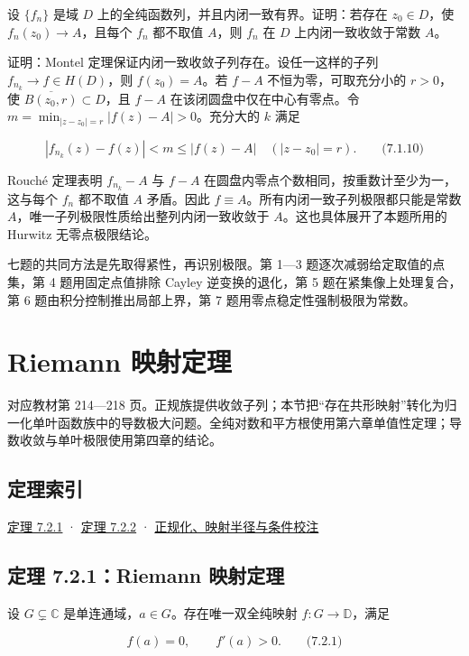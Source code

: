 \documentclass[11pt,a4paper]{article}
\begin{document}
设 \(\{f_n\}\) 是域 \(D\) 上的全纯函数列，并且内闭一致有界。证明：若存在
\(z_0\in D\)，使 \(f_n(z_0)\to A\)，且每个 \(f_n\) 都不取值 \(A\)，则
\(f_n\) 在 \(D\) 上内闭一致收敛于常数 \(A\)。

证明：Montel 定理保证内闭一致收敛子列存在。设任一这样的子列
\(f_{n_k}\to f\in H(D)\)，则 \(f(z_0)=A\)。若 \(f-A\)
不恒为零，可取充分小的 \(r>0\)，使 \(\overline{B(z_0,r)}\subset D\)，且
\(f-A\) 在该闭圆盘中仅在中心有零点。令
\(m=\min_{|z-z_0|=r}|f(z)-A|>0\)。充分大的 \(k\) 满足

\[
|f_{n_k}(z)-f(z)|<m\le|f(z)-A|
\quad(|z-z_0|=r).
\qquad\text{(7.1.10)}
\]

Rouché 定理表明 \(f_{n_k}-A\) 与 \(f-A\)
在圆盘内零点个数相同，按重数计至少为一，这与每个 \(f_n\) 都不取值 \(A\)
矛盾。因此 \(f\equiv A\)。所有内闭一致子列极限都只能是常数
\(A\)，唯一子列极限性质给出整列内闭一致收敛于
\(A\)。这也具体展开了本题所用的 Hurwitz 无零点极限结论。

七题的共同方法是先取得紧性，再识别极限。第 1---3
题逐次减弱给定取值的点集，第 4 题用固定点值排除 Cayley 逆变换的退化，第
5 题在紧集像上处理复合，第 6 题由积分控制推出局部上界，第 7
题用零点稳定性强制极限为常数。

\section{Riemann 映射定理}
对应教材第 214---218
页。正规族提供收敛子列；本节把``存在共形映射''转化为归一化单叶函数族中的导数极大问题。全纯对数和平方根使用第六章单值性定理；导数收敛与单叶极限使用第四章的结论。

\subsection*{定理索引}\label{ch07-s2-heading-1}

\hyperref[ch07-s2-heading-2]{定理 7.2.1} · \hyperref[ch07-s2-heading-3]{定理 7.2.2} ·
\hyperref[ch07-s2-heading-4]{正规化、映射半径与条件校注}

\subsection{定理 7.2.1：Riemann 映射定理}\label{ch07-s2-heading-2}

设 \(G\subsetneq\mathbb C\) 是单连通域，\(a\in G\)。存在唯一双全纯映射
\(f:G\to\mathbb D\)，满足

\[
f(a)=0,\qquad f'(a)>0.\qquad\text{(7.2.1)}
\]
\end{document}
